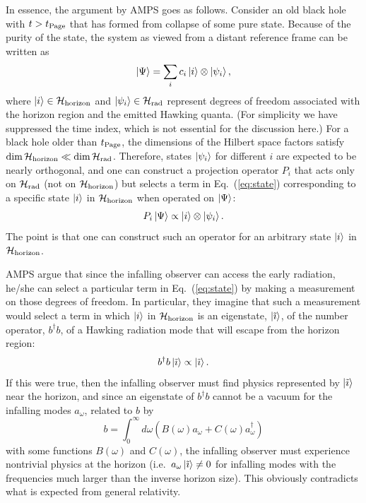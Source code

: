 \documentclass[12pt]{article}
\begin{document}
In essence, the argument by AMPS goes as follows.  Consider an old black 
hole with $t > t_{\rm Page}$ that has formed from collapse of some pure 
state.  Because of the purity of the state, the system as viewed from 
a distant reference frame can be written as
%
\begin{equation}
  \ket{\Psi} = \sum_i c_i \ket{i} \otimes \ket{\psi_i},
\label{eq:state}
\end{equation}
%
where $\ket{i} \in {\cal H}_{\rm horizon}$ and $\ket{\psi_i} \in 
{\cal H}_{\rm rad}$ represent degrees of freedom associated with the 
horizon region and the emitted Hawking quanta.  (For simplicity we have 
suppressed the time index, which is not essential for the discussion 
here.)  For a black hole older than $t_{\rm Page}$, the dimensions of 
the Hilbert space factors satisfy ${\rm dim}\,{\cal H}_{\rm horizon} 
\ll {\rm dim}\,{\cal H}_{\rm rad}$.  Therefore, states $\left| \psi_i \right>$ 
for different $i$ are expected to be nearly orthogonal, and one can 
construct a projection operator $P_i$ that acts only on ${\cal H}_{\rm 
rad}$ (not on ${\cal H}_{\rm horizon}$) but selects a term in 
Eq.~(\ref{eq:state}) corresponding to a specific state $\left| i \right>$ 
in ${\cal H}_{\rm horizon}$ when operated on $\left| \Psi \right>$:
%
\begin{equation}
  P_i \ket{\Psi} \propto \ket{i} \otimes \ket{\psi_i}.
\label{eq:projection}
\end{equation}
%
The point is that one can construct such an operator for an arbitrary 
state $\left| i \right>$ in ${\cal H}_{\rm horizon}$.

AMPS argue that since the infalling observer can access the early 
radiation, he/she can select a particular term in Eq.~(\ref{eq:state}) 
by making a measurement on those degrees of freedom.  In particular, they 
imagine that such a measurement would select a term in which $\left| i \right>$ 
in ${\cal H}_{\rm horizon}$ is an eigenstate, $\left| \tilde{\imath} \right>$, of 
the number operator, $b^\dagger b$, of a Hawking radiation mode that will 
escape from the horizon region:
%
\begin{equation}
  b^\dagger b \ket{\tilde{\imath}} \propto \ket{\tilde{\imath}}.
\label{eq:i-tilde}
\end{equation}
%
If this were true, then the infalling observer must find physics 
represented by $\left| \tilde{\imath} \right>$ near the horizon, and since 
an eigenstate of $b^\dagger b$ cannot be a vacuum for the infalling 
modes $a_\omega$, related to $b$ by
%
\begin{equation}
  b = \int_0^\infty\! d\omega 
    \left( B(\omega) a_\omega + C(\omega) a_\omega^\dagger \right)
\label{eq:b_vs_a}
\end{equation}
%
with some functions $B(\omega)$ and $C(\omega)$, the infalling observer 
must experience nontrivial physics at the horizon (i.e.\ $a_\omega 
\left| \tilde{\imath} \right> \neq 0$ for infalling modes with the frequencies 
much larger than the inverse horizon size).  This obviously contradicts 
what is expected from general relativity.
\end{document}

